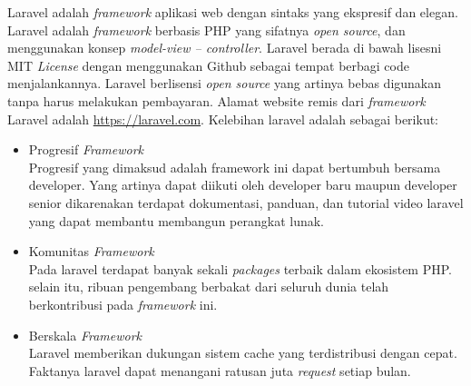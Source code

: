 Laravel adalah \textit{framework} aplikasi web dengan sintaks yang ekspresif dan elegan. Laravel adalah \textit{framework} berbasis PHP yang sifatnya \textit{open source}, dan menggunakan konsep \textit{model-view – controller}. Laravel berada di bawah lisesni MIT \textit{License} dengan menggunakan Github sebagai tempat berbagi code menjalankannya. Laravel berlisensi \textit{open source} yang artinya bebas digunakan tanpa harus melakukan pembayaran. Alamat website remis dari \textit{framework} Laravel adalah \url{https://laravel.com}. Kelebihan laravel adalah sebagai berikut:

\begin{itemize}
	\item Progresif \textit{Framework} \\
	Progresif yang dimaksud adalah framework ini dapat bertumbuh bersama developer. Yang artinya dapat diikuti oleh developer baru maupun developer senior dikarenakan terdapat dokumentasi, panduan, dan tutorial video laravel yang dapat membantu membangun perangkat lunak.
	\item Komunitas \textit{Framework} \\
	Pada laravel terdapat banyak sekali \textit{packages} terbaik dalam ekosistem PHP. selain itu, ribuan pengembang berbakat dari seluruh dunia telah berkontribusi pada \textit{framework} ini.
	\item Berskala \textit{Framework} \\
	Laravel memberikan dukungan sistem cache yang terdistribusi dengan cepat. Faktanya laravel dapat menangani ratusan juta \textit{request} setiap bulan.
\end{itemize}

